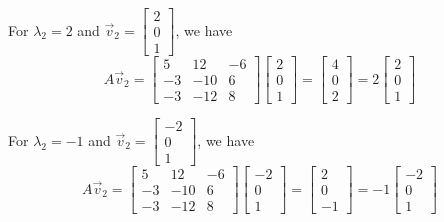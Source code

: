 {    For $\lambda_2 = 2$ and $\vec{v}_2 = \begin{bmatrix}
        2 \\ 0 \\ 1
    \end{bmatrix}$, we have
    \[
        A \vec{v}_2 = \begin{bmatrix}
            5 & 12 & -6 \\
            -3 & -10 & 6 \\
            -3 & -12 & 8
        \end{bmatrix}
        \begin{bmatrix}
            2 \\ 0 \\ 1
        \end{bmatrix}
        =
        \begin{bmatrix}
            4 \\ 0 \\ 2
        \end{bmatrix}
        = 2 \begin{bmatrix}
            2 \\ 0 \\ 1
        \end{bmatrix}
    \]






    For $\lambda_2 = -1$ and $\vec{v}_2 = \begin{bmatrix}
        -2 \\ 0 \\ 1
    \end{bmatrix}$, we have
    \[
        A \vec{v}_2 = \begin{bmatrix}
            5 & 12 & -6 \\
            -3 & -10 & 6 \\
            -3 & -12 & 8
        \end{bmatrix}
        \begin{bmatrix}
            -2 \\ 0 \\ 1
        \end{bmatrix}
        =
        \begin{bmatrix}
            2 \\ 0 \\ -1
        \end{bmatrix}
        = -1 \begin{bmatrix}
            -2 \\ 0 \\ 1
        \end{bmatrix}
    \]


}


